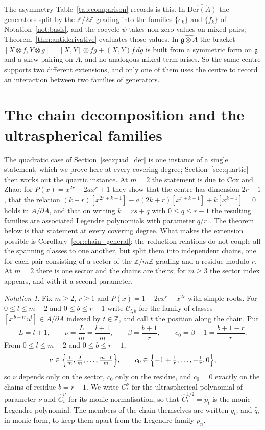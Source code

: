\documentclass[11pt]{amsart}
\theoremstyle{definition}
\theoremstyle{remark}
\newtheorem{notation}[theorem]{Notation}
\newcommand{\Z}{\mathbb{Z}}
\newcommand{\g}{\mathfrak{g}}
\newcommand{\Der}{\mathrm{Der}}
\newcommand{\pa}{\partial}
\newcommand{\hDer}{\widehat{\Der(A)}}
\newcommand{\hg}{\widehat{\g\otimes A}}
\newcommand{\ox}{\otimes}
\newcommand{\ol}[1]{\overline{#1}}
\begin{document}
The asymmetry Table~\ref{tab:comparison} records is this. In $\hDer$ the generators split by the
$\Z/2\Z$-grading into the families $\{e_k\}$ and $\{f_k\}$ of
Notation~\ref{not:basis}, and the cocycle $\psi$ takes non-zero values on mixed
pairs; Theorem~\ref{thm:antiderivative} evaluates those values. In $\hg$ the
bracket $[X\ox f,Y\ox g]=[X,Y]\ox fg+(X,Y)\ol{f\,dg}$ is built from a symmetric
form on $\g$ and a skew pairing on $A$, and no analogous mixed term arises.
So the same centre supports two different extensions, and only one of them uses
the centre to record an interaction between two families of generators.

\section{The chain decomposition and the ultraspherical families}
\label{sec:chains}

The quadratic case of Section~\ref{sec:quad_der} is one instance of a single
statement, which we prove here at every covering degree; Section~\ref{sec:quartic}
then works out the quartic instance. At $m=2$ the statement is due to Cox and
Zhao: for $P(x)=x^{2r}-2ax^{r}+1$ they show that the
centre has dimension $2r+1$, that the relation
$(k+r)[x^{2r+k-1}]-a(2k+r)[x^{r+k-1}]+k[x^{k-1}]=0$ holds in $A/\pa A$, and that
on writing $k=rs+q$ with $0\leq q\leq r-1$ the resulting families are associated
Legendre polynomials with parameter $q/r$ \cite[\S2.4]{CoxZhao2018}. The theorem
below is that statement at every covering degree. What makes the extension
possible is Corollary~\ref{cor:chain_general}: the reduction relations do not
couple all the spanning classes to one another, but split them into independent
chains, one for each pair consisting of a sector of the $\Z/m\Z$-grading and a
residue modulo $r$. At $m=2$ there is one sector and the chains are theirs; for
$m\geq3$ the sector index appears, and with it a second parameter.

\begin{notation}\label{not:chain}
Fix $m\geq2$, $r\geq1$ and $P(x)=1-2cx^{r}+x^{2r}$ with simple roots. For
$0\leq l\leq m-2$ and $0\leq b\leq r-1$ write $\mathcal C_{l,b}$ for the family
of classes $[x^{\,b+tr}u^{l}]\in A/\pa A$ indexed by $t\in\Z$, and call $t$ the
position along the chain. Put
\[
  L=l+1,\qquad
  \nu=\frac{L}{m}=\frac{l+1}{m},\qquad
  \beta=\frac{b+1}{r},\qquad
  c_0=\beta-1=\frac{b+1-r}{r}.
\]
From $0\leq l\leq m-2$ and $0\leq b\leq r-1$,
\[
  \nu\in\Bigl\{\tfrac1m,\tfrac2m,\dots,\tfrac{m-1}{m}\Bigr\},
  \qquad
  c_0\in\Bigl\{-1+\tfrac1r,\dots,-\tfrac1r,0\Bigr\},
\]
so $\nu$ depends only on the sector, $c_0$ only on the residue, and $c_0=0$
exactly on the chains of residue $b=r-1$.
We write $C^{\nu}_t$ for the ultraspherical polynomial of parameter
$\nu$ and $\hat C^{\nu}_t$ for its monic normalisation, so that
$\hat C^{1/2}_t=\hat p_t$ is the monic Legendre polynomial. The members of the
chain themselves are written $q_t$, and $\hat q_t$ in monic form, to keep them
apart from the Legendre family $p_n$.
\end{notation}
\end{document}
